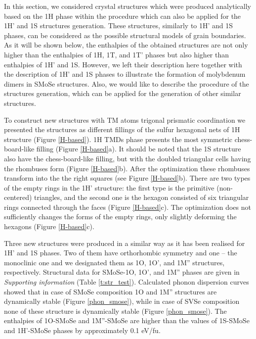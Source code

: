 \documentclass[a4paperm]{article}
\begin{document}
In this section, we considered crystal structures  which were produced analytically based on the 1H phase within the procedure which can  also be applied for the 1H' and 1S structures generation.
These structures, similarly to 1H' and 1S phases, can be considered as the possible structural models of grain boundaries.
As it will be shown below, the enthalpies of the obtained structures are not only higher than the enthalpies of 1H, 1T, and 1T' phases but also higher than enthalpies of 1H' and 1S.
However, we left their description here together with the description of 1H' and 1S phases to illustrate the formation of molybdenum dimers in SMoSe structures. 
Also, we would like to describe the procedure of the structures generation, which can be applied for the generation of other similar structures.

To construct new structures with TM atoms trigonal prismatic coordination we presented the structures as different fillings of the sulfur hexagonal nets of 1H structure (Figure \ref{H-based}).
1H TMDs phase presents the most symmetric chess-board-like filling (Figure \ref{H-based}a).
It should be noted that the 1S structure also have the chess-board-like filling, but with the doubled triangular cells having the rhombuses form (Figure \ref{H-based}b).
After the optimization these rhombuses transform into the the right squares (see Figure \ref{H-based}b).
There are two types of the empty rings in the 1H' structure: the first type is the primitive (non-centered) triangles, and the second one is the hexagon consisted of six triangular rings connected through the faces (Figure \ref{H-based}c).
The optimization does not sufficiently changes the forms of the empty rings, only slightly deforming the hexagons (Figure \ref{H-based}c).

Three new structures were produced in a similar way as it has been realised for 1H' and 1S phases. 
Two of them have orthorhombic symmetry and one -- the monoclinic one and we designated them as 1O, 1O', and 1M'' structures, respectively.
Structural data for SMoSe-1O, 1O', and 1M'' phases are given in {\it Supporting information} (Table \ref{t:str_test}).
Calculated phonon dispersion curves showed that in case of SMoSe composition 1O and 1M'' structures are dynamically stable (Figure \ref{phon_smose}), while in case of SVSe composition none of these structure is dynamically stable (Figure \ref{phon_smose}).
The enthalpies of 1O-SMoSe and 1M''-SMoSe are higher than the values of 1S-SMoSe and 1H'-SMoSe phases by approximately 0.1 eV/fu.
\end{document}
